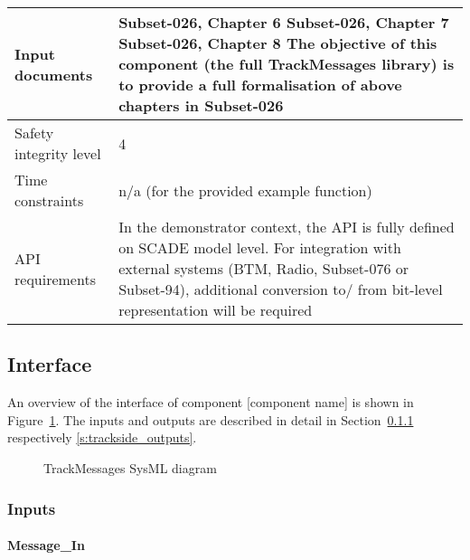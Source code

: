 \begin{longtable}{p{}p{}}
\midrule
Input documents	& 
Subset-026, Chapter 6\newline
Subset-026, Chapter 7\newline
Subset-026, Chapter 8\newline
\newline
The objective of this component (the full TrackMessages library) is to provide a full formalisation of above chapters in Subset-026\\
\midrule
Safety integrity level		& 4 \\
\midrule
Time constraints		& n/a (for the provided example function) \\
\midrule
API requirements 		& In the demonstrator context, the API is fully defined on SCADE model level. For integration with external systems (BTM, Radio, Subset-076 or Subset-94), additional conversion to/ from bit-level representation will be required\\
\bottomrule
\end{longtable}


\subsection{Interface}

An overview of the interface of component [component name] is shown in Figure~\ref{f:trackside_interface}. The inputs and outputs are described in detail in Section~\ref{s:trackside_inputs} respectively \ref{s:trackside_outputs}.

\begin{figure}
\center
{}
\caption{TrackMessages SysML diagram}\label{f:trackside_interface}
\end{figure}


\subsubsection{Inputs}\label{s:trackside_inputs}

\paragraph{Message\_In}

